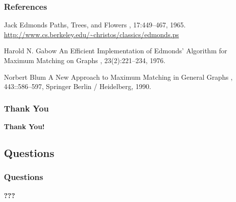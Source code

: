 \documentclass[pdftex]{beamer}
\begin{document}
\begin{frame} \frametitle{References}

  \begin{thebibliography}{1}
    \bibitem{}
    Jack Edmonds
    \newblock Paths, {T}rees, and {F}lowers
    {\scriptsize {},
      17:449--467, 1965.
      \url{http://www.cs.berkeley.edu/~christos/classics/edmonds.ps}}

    \bibitem{}
      Harold N. Gabow
      \newblock An {E}fficient {I}mplementation of {E}dmonds'
      {A}lgorithm for {M}aximum {M}atching on {G}raphs
      {\scriptsize {},
      23(2):221--234, 1976.}
      
    \bibitem{}
      Norbert Blum
      \newblock A {N}ew {A}pproach to {M}aximum {M}atching in
      {G}eneral {G}raphs
      {\scriptsize {},
        443::586--597, Springer Berlin / Heidelberg, 1990.}
  \end{thebibliography}
\end{frame}

\begin{frame} \frametitle{Thank You}
  \begin{center}
    \Huge\bf\color{blue}
    Thank You!
  \end{center}
\end{frame}

\subsection{Questions}

\begin{frame} \frametitle{Questions}
  \begin{center}
    \Huge\bf\color{blue}
    {???}
  \end{center}
\end{frame}
\end{document}
